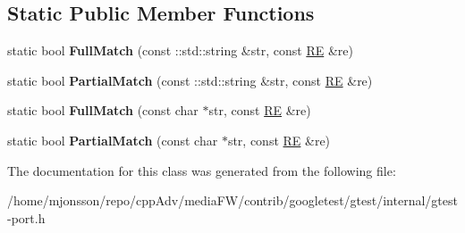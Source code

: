 \subsection*{Static Public Member Functions}
\begin{DoxyCompactItemize}
\item 
\mbox{\label{classtesting_1_1internal_1_1RE_aa79a950758d0f1d62f7762d1e9cefe86}} 
static bool {\bfseries Full\+Match} (const \+::std\+::string \&str, const \hyperlink{classtesting_1_1internal_1_1RE}{RE} \&re)
\item 
\mbox{\label{classtesting_1_1internal_1_1RE_a1e81f9a87211bdca645e025f8f0236c8}} 
static bool {\bfseries Partial\+Match} (const \+::std\+::string \&str, const \hyperlink{classtesting_1_1internal_1_1RE}{RE} \&re)
\item 
\mbox{\label{classtesting_1_1internal_1_1RE_a2b13ec1f6ccd6c32f7efa01e21588f0b}} 
static bool {\bfseries Full\+Match} (const char $\ast$str, const \hyperlink{classtesting_1_1internal_1_1RE}{RE} \&re)
\item 
\mbox{\label{classtesting_1_1internal_1_1RE_a97495dd4c2bb9589522823f060c8e8ba}} 
static bool {\bfseries Partial\+Match} (const char $\ast$str, const \hyperlink{classtesting_1_1internal_1_1RE}{RE} \&re)
\end{DoxyCompactItemize}


The documentation for this class was generated from the following file\+:\begin{DoxyCompactItemize}
\item 
/home/mjonsson/repo/cpp\+Adv/media\+F\+W/contrib/googletest/gtest/internal/gtest-\/port.\+h\end{DoxyCompactItemize}
